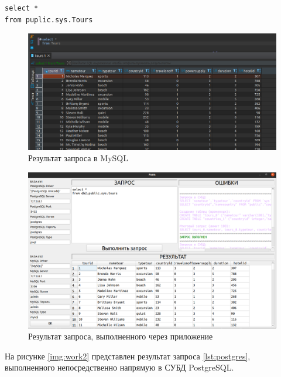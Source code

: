 \begin{lstlisting}[label=lst:mysql,caption=Запрос в MySQL]
select *
from puplic.sys.Tours
\end{lstlisting}

\begin{figure}[h!]
	\begin{center}
		\includegraphics[scale=0.55]{./inc/img/mysql1}
		\caption{Результат запроса в MySQL}
		\label{img:work1}
	\end{center}
\end{figure}

\begin{figure}[h!]
	\begin{center}
		\includegraphics[scale=0.4]{./inc/img/mysql1_1}
		\caption{Результат запроса, выполненного через приложение}
		\label{img:work1_1}
	\end{center}
\end{figure}

\newpage

На рисунке \ref{img:work2} представлен результат запроса \ref{lst:postgres}, выполненного непос\-редственно напрямую в СУБД PostgreSQL.

